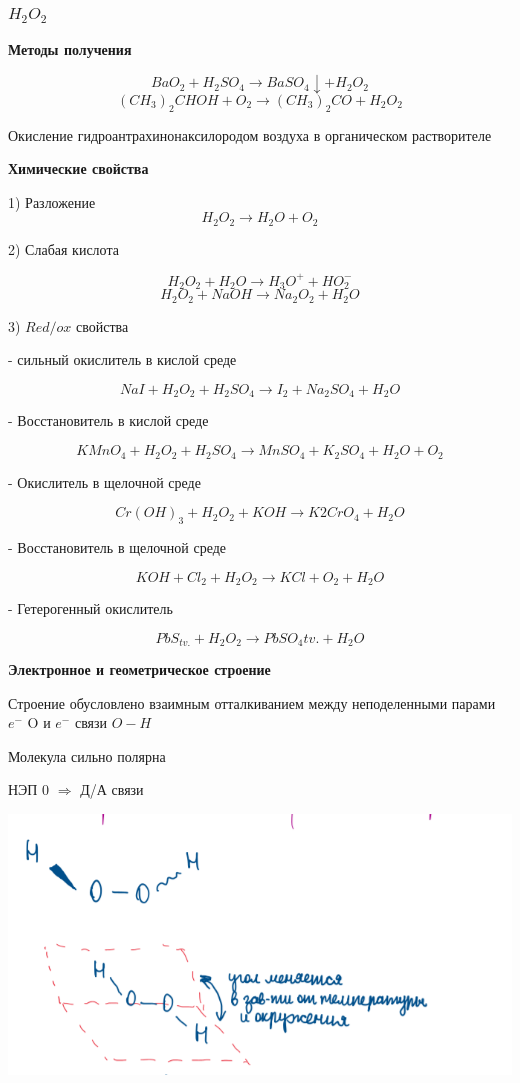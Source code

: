 \documentclass[14pt,a4paper]{scrartcl}
\begin{document}
\subsubsection{$H_2O_2$}

\textbf{Методы получения}

$$BaO_2 + H_2SO_4 \rightarrow BaSO_4\downarrow + H_2O_2$$
$$ (CH_3)_2CHOH + O_2 \rightarrow (CH_3)_2CO + H_2O_2$$

Окисление гидроантрахинонаксилородом воздуха в органическом растворителе

\textbf{Химические свойства}

1) Разложение
$$H_2O_2 \rightarrow H_2O + O_2$$

2) Слабая кислота

$$H_2O_2 + H_2O \rightarrow H_3O^+ + HO_2^-$$
$$H_2O_2 + NaOH \rightarrow Na_2O_2 + H_2O$$

3) $Red/ox$ свойства

- сильный окислитель в кислой среде

$$NaI + H_2O_2 + H_2SO_4 \rightarrow I_2 + Na_2SO_4 + H_2O$$

- Восстановитель в кислой среде

$$KMnO_4 + H_2O_2 + H_2SO_4 \rightarrow MnSO_4 + K_2SO_4 + H_2O + O_2$$

- Окислитель в щелочной среде

$$Cr(OH)_3 + H_2O_2 + KOH \rightarrow K2CrO_4 + H_2O$$

- Восстановитель в щелочной среде

$$KOH + Cl_2 + H_2O_2 \rightarrow KCl + O_2 + H_2O$$

- Гетерогенный окислитель

$$PbS_{tv.} + H_2O_2 \rightarrow PbSO_4{tv.} + H_2O$$

\textbf{Электронное и геометрическое строение}

Строение обусловлено взаимным отталкиванием между неподеленными парами $e^-$ O и $e^-$ связи $O-H$

Молекула сильно полярна

НЭП 0 $\Rightarrow$ Д/А связи

\includegraphics[scale=0.95]{6v3.png}
\end{document}
